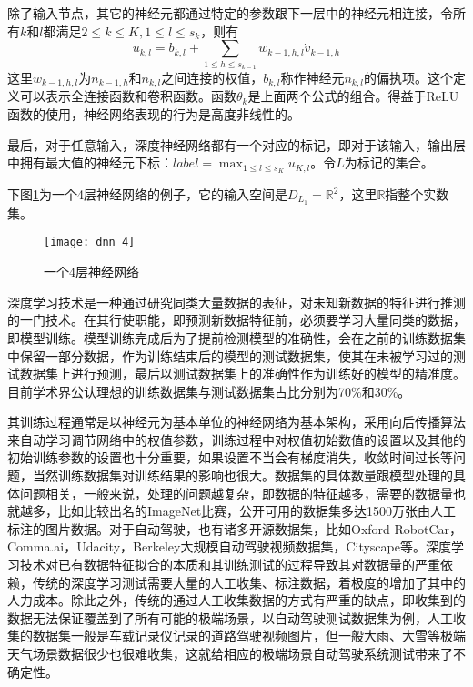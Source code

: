 除了输入节点，其它的神经元都通过特定的参数跟下一层中的神经元相连接，令所有$k$和$l$都满足$2\leq k \leq K, 1\leq l \leq s_k$，则有
$$u_{k,l}=b_{k,l}+\sum_{1\leq h\leq s_{k-1}}w_{k-1,h,l}\dot v_{k-1,h}$$
这里$w_{k-1,h,l}$为$n_{k-1,h}$和$n_{k,l}$之间连接的权值，$b_{k,l}$称作神经元$n_{k,l}$的偏执项。这个定义可以表示全连接函数和卷积函数。函数$\theta_k$是上面两个公式的组合。得益于ReLU函数的使用，神经网络表现的行为是高度非线性的。

最后，对于任意输入，深度神经网络都有一个对应的标记，即对于该输入，输出层中拥有最大值的神经元下标：$label=\max_{1\leq l\leq s_K}u_{K,l}$。令$L$为标记的集合。

下图\ref{fig:dnn}为一个4层神经网络的例子，它的输入空间是$D_{L_1}=\mathbb{R}^2$，这里$\mathbb{R}$指整个实数集。
\begin{figure}[h]
    \centering
    \texttt{[image: dnn\_4]}
    \caption{一个4层神经网络}
    \label{fig:dnn}
\end{figure}

深度学习技术是一种通过研究同类大量数据的表征，对未知新数据的特征进行推测的一门技术。在其行使职能，即预测新数据特征前，必须要学习大量同类的数据，即模型训练。模型训练完成后为了提前检测模型的准确性，会在之前的训练数据集中保留一部分数据，作为训练结束后的模型的测试数据集，使其在未被学习过的测试数据集上进行预测，最后以测试数据集上的准确性作为训练好的模型的精准度。目前学术界公认理想的训练数据集与测试数据集占比分别为70\%和30\%\cite{cs231n}。

其训练过程通常是以神经元为基本单位的神经网络为基本架构，采用向后传播算法来自动学习调节网络中的权值参数，训练过程中对权值初始数值的设置以及其他的初始训练参数的设置也十分重要，如果设置不当会有梯度消失，收敛时间过长等问题，当然训练数据集对训练结果的影响也很大。数据集的具体数量跟模型处理的具体问题相关，一般来说，处理的问题越复杂，即数据的特征越多，需要的数据量也就越多，比如比较出名的ImageNet\cite{ImageNet}比赛，公开可用的数据集多达1500万张由人工标注的图片数据。对于自动驾驶，也有诸多开源数据集，比如Oxford RobotCar\cite{ds:oxford}，Comma.ai\cite{ds:ai}，Udacity\cite{udacity_dataset}，Berkeley大规模自动驾驶视频数据集\cite{ds:berkeley}，Cityscape\cite{Cordts2016Cityscapes}等。深度学习技术对已有数据特征拟合的本质和其训练测试的过程导致其对数据量的严重依赖，传统的深度学习测试需要大量的人工收集、标注数据，着极度的增加了其中的人力成本。除此之外，传统的通过人工收集数据的方式有严重的缺点，即收集到的数据无法保证覆盖到了所有可能的极端场景，以自动驾驶测试数据集为例，人工收集的数据集一般是车载记录仪记录的道路驾驶视频图片，但一般大雨、大雪等极端天气场景数据很少也很难收集，这就给相应的极端场景自动驾驶系统测试带来了不确定性。

